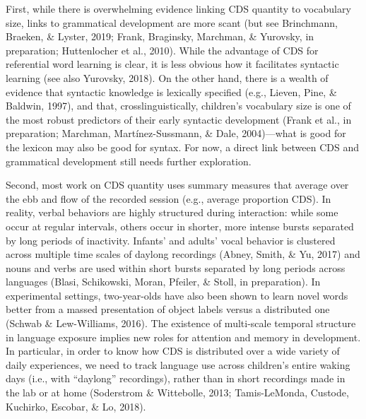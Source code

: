 \documentclass[floatsintext,man]{apa6}
\theoremstyle{definition}
\theoremstyle{definition}
\theoremstyle{definition}
\theoremstyle{remark}
\begin{document}
First, while there is overwhelming evidence linking CDS quantity to
vocabulary size, links to grammatical development are more scant (but
see Brinchmann, Braeken, \& Lyster, 2019; Frank, Braginsky, Marchman, \&
Yurovsky, in preparation; Huttenlocher et al., 2010). While the
advantage of CDS for referential word learning is clear, it is less
obvious how it facilitates syntactic learning (see also Yurovsky, 2018).
On the other hand, there is a wealth of evidence that syntactic
knowledge is lexically specified (e.g., Lieven, Pine, \& Baldwin, 1997),
and that, crosslinguistically, children's vocabulary size is one of the
most robust predictors of their early syntactic development (Frank et
al., in preparation; Marchman, Martínez-Sussmann, \& Dale, 2004)---what
is good for the lexicon may also be good for syntax. For now, a direct
link between CDS and grammatical development still needs further
exploration.

Second, most work on CDS quantity uses summary measures that average
over the ebb and flow of the recorded session (e.g., average proportion
CDS). In reality, verbal behaviors are highly structured during
interaction: while some occur at regular intervals, others occur in
shorter, more intense bursts separated by long periods of inactivity.
Infants' and adults' vocal behavior is clustered across multiple time
scales of daylong recordings (Abney, Smith, \& Yu, 2017) and nouns and
verbs are used within short bursts separated by long periods across
languages (Blasi, Schikowski, Moran, Pfeiler, \& Stoll, in preparation).
In experimental settings, two-year-olds have also been shown to learn
novel words better from a massed presentation of object labels versus a
distributed one (Schwab \& Lew-Williams, 2016). The existence of
multi-scale temporal structure in language exposure implies new roles
for attention and memory in development. In particular, in order to know
how CDS is distributed over a wide variety of daily experiences, we need
to track language use across children's entire waking days (i.e., with
\enquote{daylong} recordings), rather than in short recordings made in
the lab or at home (Soderstrom \& Wittebolle, 2013; Tamis-LeMonda,
Custode, Kuchirko, Escobar, \& Lo, 2018).
\end{document}
